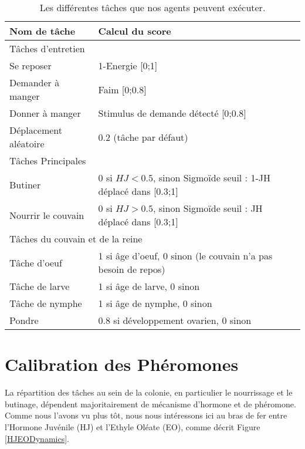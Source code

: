 		\begin{table}
        \centering
        \caption{Les différentes tâches que nos agents peuvent exécuter.}
        \begin{tabular}{|l|l|}
            \hline
            Nom de tâche & Calcul du score\\
            \hline
            \hline
            \multicolumn{2}{|l|}{Tâches d'entretien}\\
            \hline
            Se reposer & 1-Energie [0;1]\\
            Demander à manger & Faim [0;0.8] \\
            Donner à manger & Stimulus de demande détecté [0;0.8] \\
            Déplacement aléatoire & 0.2 (tâche par défaut) \\
            \hline
            \hline
            \multicolumn{2}{|l|}{Tâches Principales}\\
            \hline
            Butiner & 0 si $HJ<0.5$, sinon Sigmoïde seuil : 1-JH déplacé dans [0.3;1] \\
            Nourrir le couvain & 0 si $HJ>0.5$, sinon Sigmoïde seuil : JH déplacé dans [0.3;1] \\
            \hline
            \hline
            \multicolumn{2}{|l|}{Tâches du couvain et de la reine}\\
            \hline
            Tâche d'oeuf & 1 si âge d'oeuf, 0 sinon (le couvain n'a pas besoin de repos)\\
            Tâche de larve & 1 si âge de larve, 0 sinon\\
            Tâche de nymphe & 1 si âge de nymphe, 0 sinon \\
            Pondre & 0.8 si développement ovarien, 0 sinon\\
            \hline
            
        \end{tabular}
        \label{tableTasks}
    \end{table}
    
	\section{Calibration des Phéromones}
	
	La répartition des tâches au sein de la colonie, en particulier le nourrissage et le butinage, dépendent majoritairement de mécanisme d'hormone et de phéromone. Comme nous l'avons vu plus tôt, nous nous intéressons ici au bras de fer entre l'Hormone Juvénile (HJ) et l'Ethyle Oléate (EO), comme décrit Figure \ref{HJEODynamics}.
	
